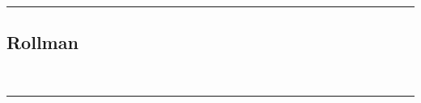 \documentclass[a4paper,12pt]{article}
\begin{document}
\vspace{-1em} %
\hrule height 1pt width 1\textwidth %
\vspace{1em} %

\clearpage




\subsection{Rollman}\

\vspace{1em} %
\hrule height 1pt width 1\textwidth %
\vspace{0em} %
\end{document}
